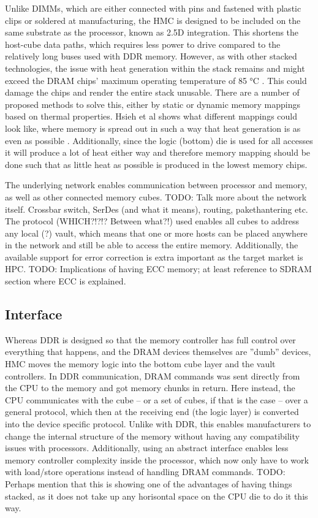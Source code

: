 Unlike DIMMs, which are either connected with pins and fastened with plastic clips or soldered at manufacturing, the HMC is designed to be included on the same substrate as the processor, known as 2.5D integration. This shortens the host-cube data paths, which requires less power to drive compared to the relatively long buses used with DDR memory. However, as with other stacked technologies, the issue with heat generation within the stack remains and might exceed the DRAM chips' maximum operating temperature of 85 °C \cite{7459470}. This could damage the chips and render the entire stack unusable. There are a number of proposed methods to solve this, either by static or dynamic memory mappings based on thermal properties. Hsieh et al shows what different mappings could look like, where memory is spread out in such a way that heat generation is as even as possible \cite{Hsieh:2013:TMM:2501626.2512457}. Additionally, since the logic (bottom) die is used for all accesses it will produce a lot of heat either way and therefore memory mapping should be done such that as little heat as possible is produced in the lowest memory chips.

The underlying network enables communication between processor and memory, as well as other connected memory cubes. 
TODO: Talk more about the network itself. Crossbar switch, SerDes (and what it means), routing, pakethantering etc. The protocol (WHICH?!?!? Between what?!) used enables all cubes to address any local (?) vault, which means that one or more hosts can be placed anywhere in the network and still be able to access the entire memory. Additionally, the available support for error correction is extra important as the target market is HPC. TODO: Implications of having ECC memory; at least reference to SDRAM section where ECC is explained. 

\subsection{Interface}
Whereas DDR is designed so that the memory controller has full control over everything that happens, and the DRAM devices themselves are ''dumb'' devices, HMC moves the memory logic into the bottom cube layer and the vault controllers. In DDR communication, DRAM commands was sent directly from the CPU to the memory and got memory chunks in return. Here instead, the CPU communicates with the cube -- or a set of cubes, if that is the case -- over a general protocol, which then at the receiving end (the logic layer) is converted into the device specific protocol. Unlike with DDR, this enables manufacturers to change the internal structure of the memory without having any compatibility issues with processors. Additionally, using an abstract interface enables less memory controller complexity inside the processor, which now only have to work with load/store operations instead of handling DRAM commands. TODO: Perhaps mention that this is showing one of the advantages of having things stacked, as it does not take up any horisontal space on the CPU die to do it this way.
\bigskip

